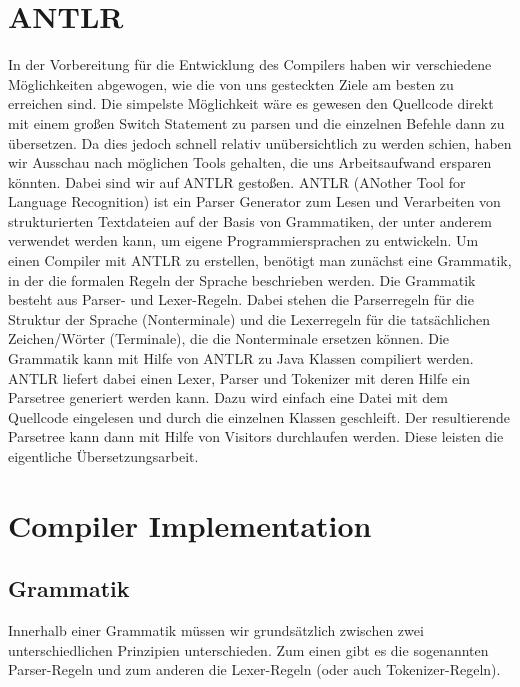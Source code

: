 \documentclass[paper=a4,fontsize=12pt,twocolumn]{scrreprt}
\begin{document}
\section{ANTLR}
In der Vorbereitung für die Entwicklung des Compilers haben wir verschiedene Möglichkeiten abgewogen, wie die von uns gesteckten Ziele am besten zu erreichen sind.
Die simpelste Möglichkeit wäre es gewesen den Quellcode direkt mit einem großen Switch Statement zu parsen und die einzelnen Befehle dann zu übersetzen.
Da dies jedoch schnell relativ unübersichtlich zu werden schien, haben wir Ausschau nach möglichen Tools gehalten, die uns Arbeitsaufwand ersparen könnten.
Dabei sind wir auf ANTLR gestoßen.
ANTLR (ANother Tool for Language Recognition) ist ein Parser Generator zum Lesen und Verarbeiten von strukturierten Textdateien auf der Basis von Grammatiken, der unter anderem verwendet werden kann, um eigene Programmiersprachen zu entwickeln.
Um einen Compiler mit ANTLR zu erstellen, benötigt man zunächst eine Grammatik, in der die formalen Regeln der Sprache beschrieben werden.
Die Grammatik besteht aus Parser- und Lexer-Regeln.
Dabei stehen die Parserregeln für die Struktur der Sprache (Nonterminale) und die Lexerregeln für die tatsächlichen Zeichen/Wörter (Terminale), die die Nonterminale ersetzen können.
Die Grammatik kann mit Hilfe von ANTLR zu Java Klassen compiliert werden.
ANTLR liefert dabei einen Lexer, Parser und Tokenizer mit deren Hilfe ein Parsetree generiert werden kann.
Dazu wird einfach eine Datei mit dem Quellcode eingelesen und durch die einzelnen Klassen geschleift.
Der resultierende Parsetree kann dann mit Hilfe von Visitors durchlaufen werden.
Diese leisten die eigentliche Übersetzungsarbeit.

\section{Compiler Implementation}

\subsection{Grammatik}
Innerhalb einer Grammatik müssen wir grundsätzlich zwischen zwei unterschiedlichen Prinzipien unterschieden.
Zum einen gibt es die sogenannten Parser-Regeln und zum anderen die Lexer-Regeln (oder auch Tokenizer-Regeln).
\end{document}
